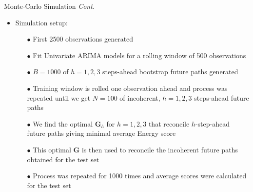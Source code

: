 \documentclass[11pt,xcolor=dvipsnames,handout]{beamer} %
\begin{document}
\begin{frame}{Monte-Carlo Simulation \textit{Cont.}}
\begin{itemize}
	\item Simulation setup: 
	\begin{itemize}[<+-| alert@+>]
		\item [$\bullet$] First 2500 observations generated
		\item [$\bullet$] Fit Univariate ARIMA models for a rolling window of 500 observations
		\item [$\bullet$] $B=1000$ of $h=1,2,3$ steps-ahead bootstrap future paths generated
		\item [$\bullet$] Training window is rolled one observation ahead and process was repeated until we get $N=100$ of incoherent, $h=1,2,3$ steps-ahead future paths
		\item [$\bullet$] We find the optimal $\bm{G}_h$ for $h=1,2,3$ that reconcile $h$-step-ahead future paths giving minimal average Energy score 
		\item [$\bullet$] This optimal $\bm{G}$ is then used to reconcile the incoherent future paths obtained for the test set
		\item [$\bullet$] Process was repeated for 1000 times and average scores were calculated for the test set
	\end{itemize}
\end{itemize}
\end{frame}
\end{document}
